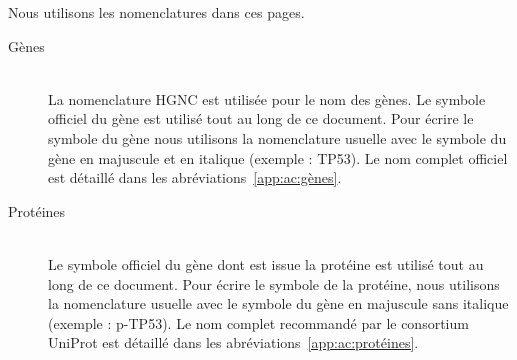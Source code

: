 	{\noindent}Nous utilisons les nomenclatures dans ces pages.
	\begin{description}
		\item[Gènes]		\hfill \\
			La nomenclature \acs{HGNC} est utilisée pour le nom des gènes. Le symbole officiel du gène est utilisé tout au long de ce document. Pour écrire le symbole du gène nous utilisons la nomenclature usuelle avec le symbole du gène en majuscule et en italique (exemple : \acs{TP53}). Le nom complet officiel est détaillé dans les abréviations~\ref{app:ac:gènes}.
		\item[Protéines]	\hfill \\
			Le symbole officiel du gène dont est issue la protéine est utilisé tout au long de ce document. Pour écrire le symbole de la protéine, nous utilisons la nomenclature usuelle avec le symbole du gène en majuscule sans italique (exemple : \acs{p-TP53}). Le nom complet recommandé par le consortium UniProt est détaillé dans les abréviations~\ref{app:ac:protéines}.
	\end{description}
